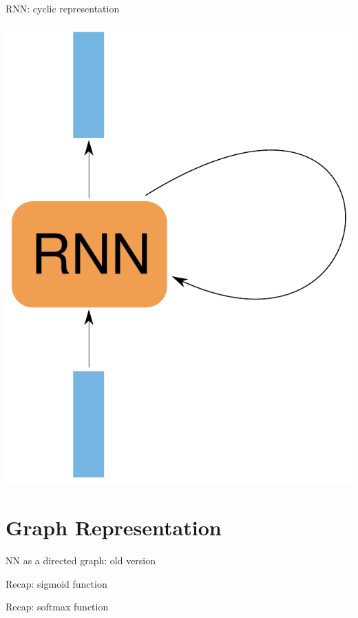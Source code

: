 \documentclass[10pt]{beamer}
\begin{document}
\begin{frame}[fragile]{RNN: cyclic representation}
\begin{center}
\includegraphics[scale=0.5]{images/RNNnaive2.pdf}
\end{center}
\end{frame}


\section{Graph Representation}

\begin{frame}[fragile]{NN as a directed graph: old version}

\end{frame}

\begin{frame}[fragile]{Recap: sigmoid function}

\end{frame}


\begin{frame}[fragile]{Recap: softmax function}

\end{frame}
\end{document}
